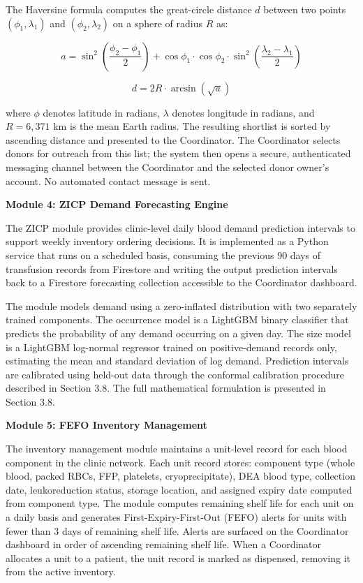 \documentclass[12pt,a4paper]{article}
\begin{document}
\noindent The Haversine formula computes the great-circle distance $d$ between two points $(\phi_1, \lambda_1)$ and $(\phi_2, \lambda_2)$ on a sphere of radius $R$ as:

\[
a = \sin^2\!\left(\frac{\phi_2 - \phi_1}{2}\right) + \cos\phi_1 \cdot \cos\phi_2 \cdot \sin^2\!\left(\frac{\lambda_2 - \lambda_1}{2}\right)
\]

\[
d = 2R \cdot \arcsin\!\left(\sqrt{a}\right)
\]

\noindent where $\phi$ denotes latitude in radians, $\lambda$ denotes longitude in radians, and $R = 6{,}371$ km is the mean Earth radius. The resulting shortlist is sorted by ascending distance and presented to the Coordinator. The Coordinator selects donors for outreach from this list; the system then opens a secure, authenticated messaging channel between the Coordinator and the selected donor owner's account. No automated contact message is sent.

\vspace{1em}
\noindent\textbf{Module 4: ZICP Demand Forecasting Engine}
\vspace{0.5em}

\noindent The ZICP module provides clinic-level daily blood demand prediction intervals to support weekly inventory ordering decisions. It is implemented as a Python service that runs on a scheduled basis, consuming the previous 90 days of transfusion records from Firestore and writing the output prediction intervals back to a Firestore forecasting collection accessible to the Coordinator dashboard.

\noindent The module models demand using a zero-inflated distribution with two separately trained components. The occurrence model is a LightGBM binary classifier that predicts the probability of any demand occurring on a given day. The size model is a LightGBM log-normal regressor trained on positive-demand records only, estimating the mean and standard deviation of log demand. Prediction intervals are calibrated using held-out data through the conformal calibration procedure described in Section 3.8. The full mathematical formulation is presented in Section 3.8.

\vspace{1em}
\noindent\textbf{Module 5: FEFO Inventory Management}
\vspace{0.5em}

\noindent The inventory management module maintains a unit-level record for each blood component in the clinic network. Each unit record stores: component type (whole blood, packed RBCs, FFP, platelets, cryoprecipitate), DEA blood type, collection date, leukoreduction status, storage location, and assigned expiry date computed from component type. The module computes remaining shelf life for each unit on a daily basis and generates First-Expiry-First-Out (FEFO) alerts for units with fewer than 3 days of remaining shelf life. Alerts are surfaced on the Coordinator dashboard in order of ascending remaining shelf life. When a Coordinator allocates a unit to a patient, the unit record is marked as dispensed, removing it from the active inventory.
\end{document}
